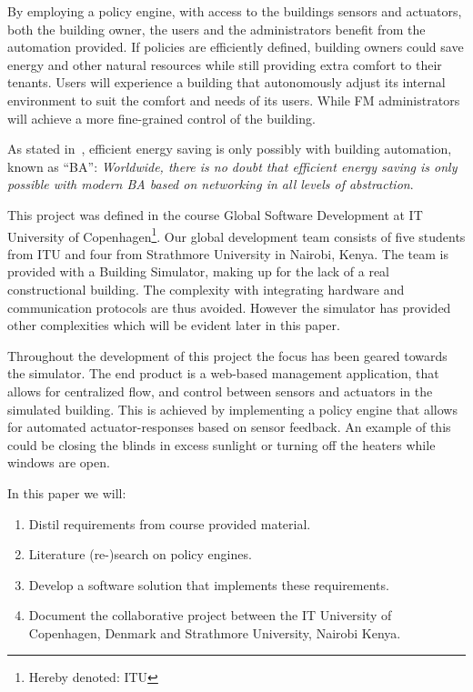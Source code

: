 By employing a policy engine, with access to the buildings sensors and actuators, both the building owner, the users and the administrators benefit from the automation provided. If policies are efficiently defined, building owners could save energy and other natural resources while still providing extra comfort to their tenants. Users will experience a building that autonomously adjust its internal environment to suit the comfort and needs of its users. While FM administrators will achieve a more fine-grained control of the building.

As stated in~\cite{ba-short}, efficient energy saving is only possibly with building automation, known as ``BA'': \textit{Worldwide, there is no doubt that efficient energy saving is only possible with modern BA based on networking in all levels of abstraction}.

This project was defined in the course Global Software Development at IT University of Copenhagen\footnote{Hereby denoted: ITU}. Our global development team consists of five students from ITU and four from Strathmore University in Nairobi, Kenya. The team is provided with a Building Simulator, making up for the lack of a real constructional building. The complexity with integrating hardware and communication protocols are thus avoided. However the simulator has provided other complexities which will be evident later in this paper. 

Throughout the development of this project the focus has been geared towards the simulator. The end product is a web-based management application, that allows for centralized flow, and control between sensors and actuators in the simulated building. This is achieved by implementing a policy engine that allows for automated actuator-responses based on sensor feedback. An example of this could be closing the blinds in excess sunlight or turning off the heaters while windows are open.

In this paper we will: 
\begin{enumerate}
	\item Distil requirements from course provided material.
	\item Literature (re-)search on policy engines.
	\item Develop a software solution that implements these requirements.
	\item Document the collaborative project between the IT University of Copenhagen, Denmark and Strathmore University, Nairobi Kenya.
\end{enumerate}

